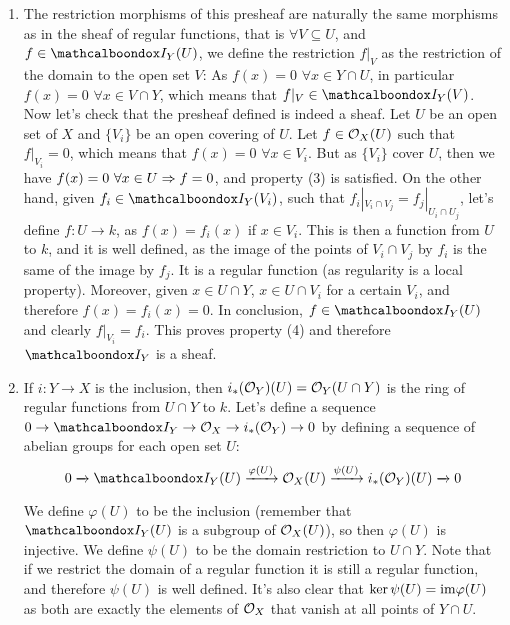 \begin{sol}
	\begin{enumerate}[label = \alph*)]
		\item The restriction morphisms of this presheaf are naturally the same morphisms as in the sheaf of regular functions, that is $\forall V \subseteq U$, and $f \in \sI_Y(U)$, we define the restriction $f|_V$ as the restriction of the domain to the open set $V$: As $f(x) = 0 \, \, \forall x \in Y \cap U$, in particular $f(x) = 0 \, \, \forall x \in V \cap Y$, which means that $f|_V \in \sI_Y(V)$. Now let's check that the presheaf defined is indeed a sheaf. Let $U$ be an open set of $X$ and $\{V_i\}$ be an open covering of $U$. Let $f \in \mathcal{O}_X(U)$ such that $f|_{V_i} = 0$, which means that $f(x) = 0 \, \, \forall x \in V_i$. But as $\{V_i\}$ cover $U$, then we have $f(x) = 0 \, \, \forall x \in U \Rightarrow f = 0$, and property (3) is satisfied. On the other hand, given $f_i \in \sI_Y(V_i)$, such that $f_i|_{V_i \cap V_j} = f_j|_{U_i \cap U_j}$, let's define $f: U \to k$, as $f(x) = f_i(x)$ if $x \in V_i$. This is then a function from $U$ to $k$, and it is well defined, as the image of the points of $V_i \cap V_j$ by $f_i$ is the same of the image by $f_j$. It is a regular function (as regularity is a local property). Moreover, given $x \in U \cap Y$, $x \in U \cap V_i$ for a certain $V_i$, and therefore $f(x) = f_i(x) = 0$. In conclusion, $f \in \sI_Y(U)$ and clearly $f|_{V_i} = f_i$. This proves property (4) and therefore $\sI_Y$ is a sheaf.

		\item If $i: Y \to X$ is the inclusion, then $i_*(\mathcal{O}_Y)(U) = \mathcal{O}_Y(U \cap Y)$ is the ring of regular functions from $U \cap Y$ to $k$. Let's define a sequence $0 \to \sI_Y \to \locO_X \to i_*(\locO_Y) \to 0$ by defining a sequence of abelian groups for each open set $U$:
		\[
			0 \xrightarrow{} \sI_Y(U) \xrightarrow{\varphi(U)} \locO_X(U) \xrightarrow{\psi(U)} i_*(\locO_Y)(U) \xrightarrow{} 0
		\] 

		We define $\varphi(U)$ to be the inclusion (remember that $\sI_Y(U)$ is a subgroup of $\mathcal{O}_X(U)$), so then $\varphi(U)$ is injective. We define $\psi(U)$ to be the domain restriction to $U \cap Y$. Note that if we restrict the domain of a regular function it is still a regular function, and therefore $\psi(U)$ is well defined. It's also clear that $\ker \psi(U) = \mathrm{im} \varphi(U)$ as both are exactly the elements of $\mathcal{O}_X$ that vanish at all points of $Y \cap U$.


\end{enumerate}
\end{sol}
